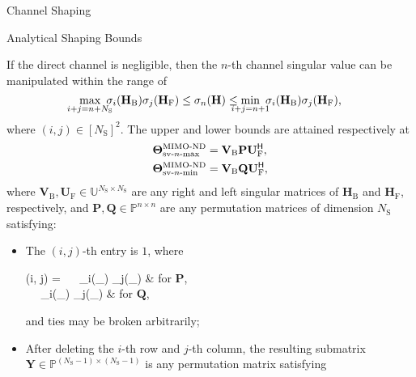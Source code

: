 \documentclass[journal]{IEEEtran}
\begin{document}
\begin{section}{Channel Shaping}
\begin{subsection}{Analytical Shaping Bounds}
		\begin{corollary}
			\label{co:nd_sv_indl}
			If the direct channel is negligible,
			then the $n$-th channel singular value can be manipulated within the range of
			\begin{equation}
				\label{iq:sv_nd_indl}
				\max_{\mathclap{i+j=n+N_\mathrm{S}}} \ \sigma_i(\mathbf{H}_\mathrm{B}) \sigma_j(\mathbf{H}_\mathrm{F}) \le \sigma_n(\mathbf{H}) \le \min_{\mathclap{i+j=n+1}} \ \sigma_i(\mathbf{H}_\mathrm{B}) \sigma_j(\mathbf{H}_\mathrm{F}),
			\end{equation}
			where $(i, j) \in [N_\mathrm{S}]^2$.
			The upper and lower bounds are attained respectively at
			\begin{subequations}
				\label{eq:ris_nd_sv_indl}
				\begin{align}
					\mathbf{\Theta}_{\textnormal{sv-}n\textnormal{-max}}^\textnormal{MIMO-ND} & = \mathbf{V}_\mathrm{B} \mathbf{P} \mathbf{U}_\mathrm{F}^\mathsf{H}, \label{eq:ris_nd_sv_indl_max} \\
					\mathbf{\Theta}_{\textnormal{sv-}n\textnormal{-min}}^\textnormal{MIMO-ND} & = \mathbf{V}_\mathrm{B} \mathbf{Q} \mathbf{U}_\mathrm{F}^\mathsf{H}, \label{eq:ris_nd_sv_indl_min}
				\end{align}
			\end{subequations}
			where $\mathbf{V}_\mathrm{B}, \mathbf{U}_\mathrm{F} \in \mathbb{U}^{N_\mathrm{S} \times N_\mathrm{S}}$ are any right and left singular matrices of $\mathbf{H}_\mathrm{B}$ and $\mathbf{H}_\mathrm{F}$, respectively,
			and $\mathbf{P},\mathbf{Q} \in \mathbb{P}^{n \times n}$ are any permutation matrices of dimension $N_\mathrm{S}$ satisfying:
			\begin{itemize}
				\item The $(i, j)$-th entry is $1$, where
					\begin{subnumcases}{(i, j) =}
						\  \ \sigma_i(\mathbf{H}_) \sigma_j(_) & for $\mathbf{P}$, \label{eq:idx_nd_sv_indl_max} \\
						\  \ \sigma_i(\mathbf{H}_) \sigma_j(_) & for $\mathbf{Q}$, \label{eq:idx_nd_sv_indl_min}
					\end{subnumcases}
					and ties may be broken arbitrarily;
				\item After deleting the $i$-th row and $j$-th column, the resulting submatrix $\mathbf{Y} \in \mathbb{P}^{(N_\mathrm{S}-1) \times (N_\mathrm{S}-1)}$ is any permutation matrix satisfying

\end{itemize}
\end{corollary}
\end{subsection}
\end{section}
\end{document}
